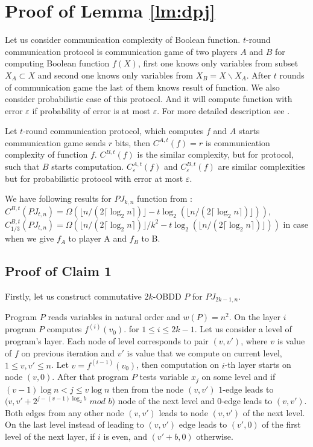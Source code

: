 \documentclass{llncs}
\begin{document}
\section{Proof of Lemma \ref{lm:dpj}}\label{apx:dpj}

Let us consider communication complexity of Boolean function. $t$-round communication protocol is communication game of two players $A$ and $B$ for computing Boolean function $f(X)$, first one knows only variables from subset $X_A\subset X$ and second one knows only variables from $X_B=X\backslash X_A$. After $t$ rounds of communication game the last of them knows result of function. We also consider probabilistic case of this protocol. And it will compute function with error $\varepsilon$ if probability of error is at most $\varepsilon$. For more detailed description see \cite{nw91}.

Let $t$-round communication protocol, which computes $f$ and $A$ starts communication game sends $r$ bits, then $C^{A,t}(f)=r$ is communication complexity of function $f$. $C^{B,t}(f)$ is the similar complexity, but for protocol, such that $B$ starts computation. $C^{A,t}_{\varepsilon}(f)$ and $C^{B,t}_{\varepsilon}(f)$ are similar complexities but for probabilistic protocol with error at most $\varepsilon$.

We have following results for $PJ_{k,n}$ function from \cite{nw91}:
$C^{B,t}(PJ_{t,n})=\Omega(\lfloor n/(2\lceil \log_2 n\rceil)\rfloor - t\log_2(\lfloor n/(2\lceil \log_2 n\rceil)\rfloor))$, $C^{B,t}_{1/3}(PJ_{t,n})=\Omega(\lfloor n/(2\lceil \log_2 n\rceil)\rfloor/k^2 - t\log_2(\lfloor n/(2\lceil \log_2 n\rceil)\rfloor))$ in case when we give $f_A$ to player A and $f_B$ to B.
\subsection{Proof of Claim 1}
Firstly, let us construct commutative $2k$-OBDD $P$ for $PJ_{2k-1,n}$.

Program $P$ reads variables in natural order and $w(P)=n^2$.
On the layer $i$ program $P$ computes $f^{(i)}(v_0)$. for $1\leq i \leq 2k-1$. Let us consider a level of program's layer. Each node of level corresponds to pair $(v,v')$, where $v$ is value of $f$ on previous iteration and $v'$ is value that we compute on current level, $1\leq v, v'\leq n$. Let $v=f^{(i-1)}(v_0)$, then computation on $i$-th layer starts on node $(v,0)$. After that program $P$ tests variable $x_j$ on some level and if $(v-1)\log n <j\leq v\log n$ then from the node $(v,v')$ $1$-edge leads to $(v, v'+2^{j-(v-1)\log_2 b}$ $mod$ $b)$ node of the next level and $0$-edge leads to $(v,v')$. Both edges from any other node $(v,v')$ leads to node $(v,v')$ of the next level. On the last level instead of leading to $(v,v')$ edge leads to $(v',0)$  of the first level of the next layer, if $i$ is even, and $(v'+b,0)$ otherwise.
\end{document}
